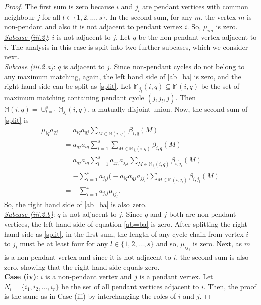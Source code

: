 \documentclass[10pt,a4paper]{amsart}
\begin{document}
\begin{proof}
The first sum is zero because $i$ and $j_l$ are pendant vertices with common neighbour $j$ for all $l\in \{1,2,\ldots ,s\}$. In the second sum, for any $m$, the vertex $m$ is non-pendant and also it is not adjacent to pendant vertex $i$. So, $\mu _{im}$ is zero.\\
\underline{{\it Subcase \rm{(iii.2)}}}: $i$ is not adjacent to $j$. Let $q$ be the non-pendant vertex adjacent to $i$. The analysis in this case is split into two further subcases, which we consider next. \\
\underline{{\it Subcase \rm{(iii.2.a)}}}: $q$ is adjacent to $j$. Since non-pendant cycles do not belong to any maximum matching, again, the left hand side of \ref{ab=ba} is zero, and the right hand side can be split as \ref{split}. Let $\mathbb{M}_{j_l}(i,q)\subseteq \mathbb{M}(i,q)$ be the set of maximum matching containing pendant cycle $(j,j_l,j)$. Then $\mathbb{M}(i,q)=\cup _{l=1}^s\mathbb{M}_{j_l}(i,q)$, a mutually disjoint union. Now, the second sum of \ref{split} is
\begin{align*}
\mu _{iq}a_{qj}& =a_{iq}a_{qj}\sum _{M\in \mathbb{M}(i,q)}\beta _{\overline{i,q}}(M) \\
 &= a_{qj}a_{iq}\sum _{l=1}^s\sum _{M\in \mathbb{M}_{j_l}(i,q)}\beta _{\overline{i,q}}(M) \\
 &= a_{qj}a_{iq}\sum _{l=1}^sa_{jj_l}a_{j_lj}\sum _{M\in \mathbb{M}_{j_l}(i,q)}\beta _{\overline{i,j_l}}(M) \\
 &= -\sum _{l=1}^sa_{j_lj}\big (-a_{iq}a_{qj}a_{jj_l}\big )\sum _{M\in \mathbb{M}(i,j_l)}\beta _{\overline{i,j_l}}(M) \\
 &= -\sum _{l=1}^sa_{j_lj}\mu _{ij_l}.
\end{align*} 
So, the right hand side of \ref{ab=ba} is also zero.\\
\underline{{\it Subcase \rm{(iii.2.b)}}}: $q$ is not adjacent to $j$. Since $q$ and $j$ both are non-pendant vertices, the left hand side of equation \ref{ab=ba} is zero. After splitting the right hand side as \ref{split}, in the first sum, the length of any cycle chain from vertex $i$ to $j_l$ must be at least four for any $l\in \{1,2,\ldots ,s\}$ and so, $\mu _{ij_j}$ is zero. Next, as $m$ is a non-pendant vertex and since it is not adjacent to $i$, the second sum is also zero, showing that the right hand side equals zero.\\
{\bf Case (iv)}: $i$ is a non-pendant vertex and $j$ is a pendant vertex. Let $N_i=\{i_1,i_2,\ldots ,i_r\}$ be the set of all pendant vertices adjacent to $i$. Then, the proof is the same as in Case (iii) by interchanging the roles of $i$ and $j$.
\end{proof}
\end{document}
